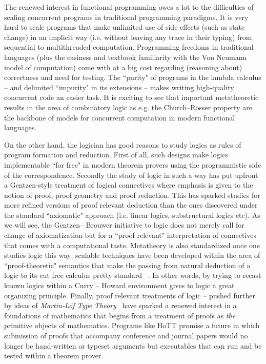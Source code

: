 The renewed interest in functional programming owes a lot to the difficulties of scaling concurrent programs in traditional programming paradigms. It is very hard  to scale programs that make unlimited use of side effects (such as state change) in an implicit way (i.e. without leaving any trace in their typing) from sequential to  multithreaded computation. Programming freedoms in traditional languages (plus the easiness and textbook familiarity with the Von Neumann model of computation) come with at a big cost regarding  (reasoning about) correctness and need for testing. The ``purity" of programs in the lambda calculus -- and delimited ``impurity" in its extensions -- makes writing high-quality concurrent code an easier task. It is exciting to see that important metatheoretic results in the area of combinatory logic as e.g. the Church--Rosser property are the backbone of models for concurrent computation in modern functional languages. 

On the other hand, the logician has good reasons to study logics as rules of program formation and reduction. First of all, such designs make logics implementable ``for free"
in modern theorem provers using the programmistic side of the correspondence. Secondly the study of logic in such a way has put upfront a  Gentzen-style treatment of logical connectives where emphasis is given to the notion of proof, proof geometry and proof reduction. This  has sparked studies for more refined versions of proof relevant deduction  than the ones discovered under the standard ``axiomatic" approach (i.e. linear logics, substructural logics etc). As we will see, the Gentzen-- Brouwer initiative to  logic  does not merely call for change of axiomatization but for a ``proof relevant" interpretation of connectives that comes with a computational taste. Metatheory is also standardized once one studies logic this way;  scalable techniques have been developed within the area of ``proof-theoretic" semantics that make the passing from  natural deduction of a logic to its cut free calculus pretty standard ~\cite{Sieg1998,pfenning2000structural}. In other words, by trying to recast known logics within a Curry -- Howard environment gives to logic a great organizing principle. Finally, proof relevant treatments of logic -- pushed further by ideas of \emph{Martin-L\"{o}f Type Theory}~\cite{martin1984intuitionistic} have sparked  a renewed interest in a foundations of mathematics that begins from a  treatment of proofs as \textit{the} primitive objects of mathematics. Programs like   \ac{HoTT} promise  a future in which submission of proofs that accompany conference and journal papers would no longer be hand-written or typeset arguments but executables that can run and be tested within a theorem prover.

